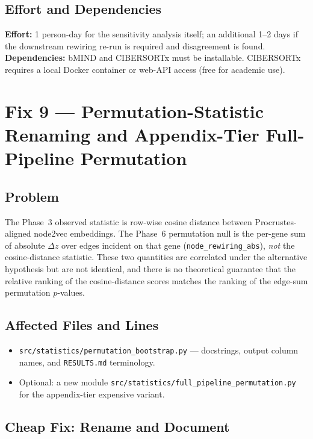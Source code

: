 \documentclass[11pt]{article}
\newcommand{\code}[1]{\texttt{#1}}
\begin{document}
\subsection{Effort and Dependencies}

\textbf{Effort:} 1 person-day for the sensitivity analysis itself; an additional 1--2 days if the downstream rewiring re-run is required and disagreement is found. \textbf{Dependencies:} bMIND and CIBERSORTx must be installable. CIBERSORTx requires a local Docker container or web-API access (free for academic use).

\section{Fix 9 --- Permutation-Statistic Renaming and Appendix-Tier Full-Pipeline Permutation}

\subsection{Problem}

The Phase~3 observed statistic is row-wise cosine distance between Procrustes-aligned node2vec embeddings. The Phase~6 permutation null is the per-gene sum of absolute $\Delta z$ over edges incident on that gene (\code{node\_rewiring\_abs}), \emph{not} the cosine-distance statistic. These two quantities are correlated under the alternative hypothesis but are not identical, and there is no theoretical guarantee that the relative ranking of the cosine-distance scores matches the ranking of the edge-sum permutation $p$-values.

\subsection{Affected Files and Lines}

\begin{itemize}[leftmargin=*]
\item \code{src/statistics/permutation\_bootstrap.py} --- docstrings, output column names, and \code{RESULTS.md} terminology.
\item Optional: a new module \code{src/statistics/full\_pipeline\_permutation.py} for the appendix-tier expensive variant.
\end{itemize}

\subsection{Cheap Fix: Rename and Document}
\end{document}
